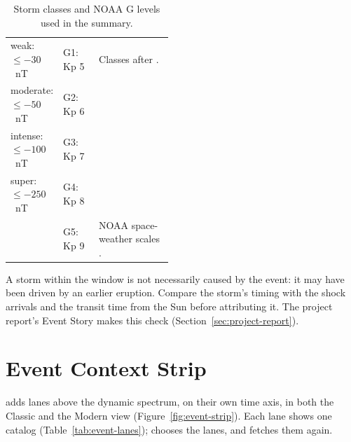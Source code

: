 \begin{table}[!htbp]
  \centering
  \caption{Storm classes and NOAA G levels used in the summary.}
  \label{tab:storm-classes}
  \small
  \begin{tabularx}{\linewidth}{@{}P{0.24\linewidth}P{0.22\linewidth}L@{}}
    \toprule
     &  &  \\
    \midrule
    weak: \(\leq -30\)~nT & G1: Kp 5 & Classes after \textcite{gonzalez1994}. \\
    moderate: \(\leq -50\)~nT & G2: Kp 6 & \\
    intense: \(\leq -100\)~nT & G3: Kp 7 & \\
    super: \(\leq -250\)~nT & G4: Kp 8 & \\
     & G5: Kp 9 & NOAA space-weather scales \parencite{noaascales}. \\
    \bottomrule
  \end{tabularx}
\end{table}

\begin{caution}
  A storm within the window is not necessarily caused by the event: it may have been driven by
  an earlier eruption. Compare the storm's timing with the shock arrivals and the transit time
  from the Sun before attributing it. The project report's Event Story makes this check
  (Section~\ref{sec:project-report}).
\end{caution}

\section{Event Context Strip}
\label{sec:event-strip}

 adds lanes above the dynamic spectrum, on their own time
axis, in both the Classic and the Modern view (Figure~\ref{fig:event-strip}). Each lane shows
one catalog (Table~\ref{tab:event-lanes});  chooses the
lanes, and  fetches them again.


